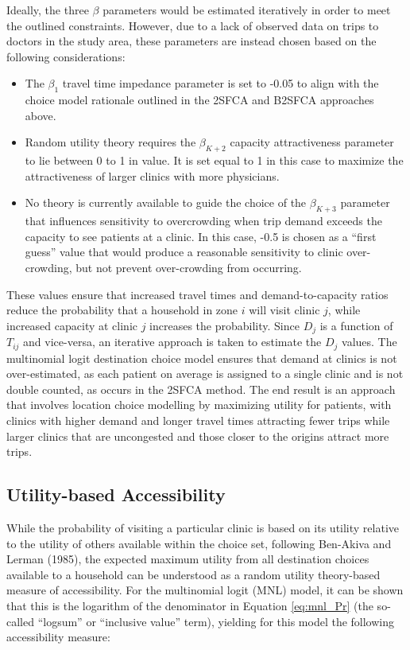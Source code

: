 \documentclass[]{elsarticle} %
\providecommand{\tightlist}{%
  \setlength{\itemsep}{0pt}\setlength{\parskip}{0pt}}
\begin{document}
Ideally, the three \(\beta\) parameters would be estimated iteratively
in order to meet the outlined constraints. However, due to a lack of
observed data on trips to doctors in the study area, these parameters
are instead chosen based on the following considerations:

\begin{itemize}
\tightlist
\item
  The \(\beta_1\) travel time impedance parameter is set to -0.05 to
  align with the choice model rationale outlined in the 2SFCA and B2SFCA
  approaches above.
\item
  Random utility theory requires the \(\beta_{K+2}\) capacity
  attractiveness parameter to lie between 0 to 1 in value. It is set
  equal to 1 in this case to maximize the attractiveness of larger
  clinics with more physicians.
\item
  No theory is currently available to guide the choice of the
  \(\beta_{K+3}\) parameter that influences sensitivity to overcrowding
  when trip demand exceeds the capacity to see patients at a clinic. In
  this case, -0.5 is chosen as a ``first guess'' value that would
  produce a reasonable sensitivity to clinic over-crowding, but not
  prevent over-crowding from occurring.
\end{itemize}

These values ensure that increased travel times and demand-to-capacity
ratios reduce the probability that a household in zone \(i\) will visit
clinic \(j\), while increased capacity at clinic \(j\) increases the
probability. Since \(D_j\) is a function of \(T_{ij}\) and vice-versa,
an iterative approach is taken to estimate the \(D_j\) values. The
multinomial logit destination choice model ensures that demand at
clinics is not over-estimated, as each patient on average is assigned to
a single clinic and is not double counted, as occurs in the 2SFCA
method. The end result is an approach that involves location choice
modelling by maximizing utility for patients, with clinics with higher
demand and longer travel times attracting fewer trips while larger
clinics that are uncongested and those closer to the origins attract
more trips.

\hypertarget{utility-based-accessibility}{%
\subsection{Utility-based
Accessibility}\label{utility-based-accessibility}}

While the probability of visiting a particular clinic is based on its
utility relative to the utility of others available within the choice
set, following Ben-Akiva and Lerman (1985), the expected maximum utility
from all destination choices available to a household can be understood
as a random utility theory-based measure of accessibility. For the
multinomial logit (MNL) model, it can be shown that this is the
logarithm of the denominator in Equation \ref{eq:mnl_Pr} (the so-called
``logsum'' or ``inclusive value'' term), yielding for this model the
following accessibility measure:
\end{document}
